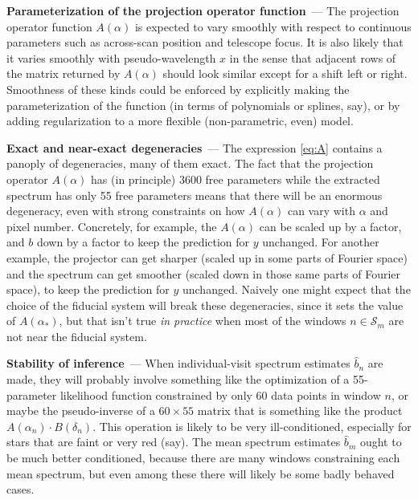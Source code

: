 \documentclass[11pt]{article}
\renewcommand{\paragraph}[1]{\medskip\par\noindent\textbf{#1}~---}
\begin{document}
\paragraph{Parameterization of the projection operator function}
The projection operator function $A(\alpha)$ is expected to vary smoothly with respect to continuous parameters such as across-scan position and telescope focus.
It is also likely that it varies smoothly with pseudo-wavelength $x$ in the sense that adjacent rows of the matrix returned by $A(\alpha)$ should look similar except for a shift left or right.
Smoothness of these kinds could be enforced by explicitly making the parameterization of the function (in terms of polynomials or splines, say), or by adding regularization to a more flexible (non-parametric, even) model.

\paragraph{Exact and near-exact degeneracies}
The expression \eqref{eq:A} contains a panoply of degeneracies, many of them exact.
The fact that the projection operator $A(\alpha)$ has (in principle) 3600 free parameters while the extracted spectrum has only 55 free parameters means that there will be an enormous degeneracy, even with strong constraints on how $A(\alpha)$ can vary with $\alpha$ and pixel number.
Concretely, for example, the $A(\alpha)$ can be scaled up by a factor, and $b$ down by a factor to keep the prediction for $y$ unchanged.
For another example, the projector can get sharper (scaled up in some parts of Fourier space) and the spectrum can get smoother (scaled down in those same parts of Fourier space), to keep the prediction for $y$ unchanged.
Naively one might expect that the choice of the fiducial system will break these degeneracies, since it sets the value of $A(\alpha_\ast)$, but that isn't true \emph{in practice} when most of the windows $n\in\mathscr{S}_m$ are not near the fiducial system.

\paragraph{Stability of inference}
When individual-visit spectrum estimates $\hat{b}_n$ are made, they will probably involve something like the optimization of a 55-parameter likelihood function constrained by only 60 data points in window $n$, or maybe the pseudo-inverse of a $60\times 55$ matrix that is something like the product $A(\alpha_n)\cdot B(\delta_n)$.
This operation is likely to be very ill-conditioned, especially for stars that are faint or very red (say).
The mean spectrum estimates $\hat{b}_m$ ought to be much better conditioned, because there are many windows constraining each mean spectrum, but even among these there will likely be some badly behaved cases.
\end{document}
